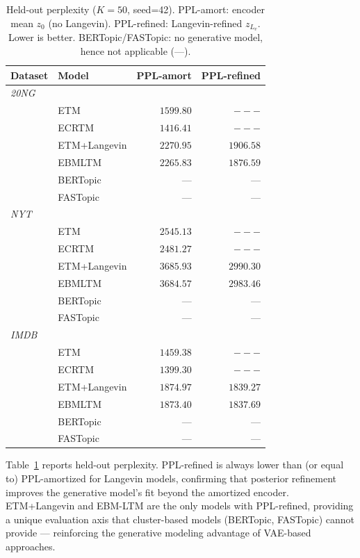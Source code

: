 \documentclass[10pt]{article}
\begin{document}
\begin{table}[t]
\centering
\caption{Held-out perplexity ($K=50$, seed=42). PPL-amort: encoder mean $z_0$ (no Langevin).
PPL-refined: Langevin-refined $z_{L_v}$. Lower is better. BERTopic/FASTopic: no generative
model, hence not applicable (---).}
\label{tab:ppl}
\small
\begin{tabular}{llrr}
\hline
\textbf{Dataset} & \textbf{Model} & \textbf{PPL-amort} & \textbf{PPL-refined} \\
\hline
\multicolumn{4}{l}{\textit{20NG}} \\
  & ETM & $1599.80$ & $---$ \\
  & ECRTM & $1416.41$ & $---$ \\
  & ETM+Langevin & $2270.95$ & $1906.58$ \\
  & EBMLTM & $2265.83$ & $1876.59$ \\
  & BERTopic & --- & --- \\
  & FASTopic & --- & --- \\
\hline
\multicolumn{4}{l}{\textit{NYT}} \\
  & ETM & $2545.13$ & $---$ \\
  & ECRTM & $2481.27$ & $---$ \\
  & ETM+Langevin & $3685.93$ & $2990.30$ \\
  & EBMLTM & $3684.57$ & $2983.46$ \\
  & BERTopic & --- & --- \\
  & FASTopic & --- & --- \\
\hline
\multicolumn{4}{l}{\textit{IMDB}} \\
  & ETM & $1459.38$ & $---$ \\
  & ECRTM & $1399.30$ & $---$ \\
  & ETM+Langevin & $1874.97$ & $1839.27$ \\
  & EBMLTM & $1873.40$ & $1837.69$ \\
  & BERTopic & --- & --- \\
  & FASTopic & --- & --- \\
\hline
\end{tabular}
\end{table}

Table~\ref{tab:ppl} reports held-out perplexity.
PPL-refined is always lower than (or equal to) PPL-amortized for Langevin models,
confirming that posterior refinement improves the generative model's fit beyond
the amortized encoder.
ETM+Langevin and EBM-LTM are the only models with PPL-refined, providing
a unique evaluation axis that cluster-based models (BERTopic, FASTopic) cannot
provide --- reinforcing the generative modeling advantage of VAE-based approaches.
\end{document}
